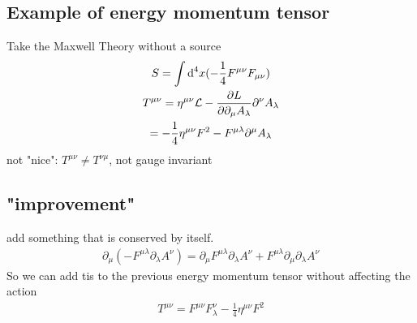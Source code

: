 \subsection{Example of energy momentum tensor}
Take the Maxwell Theory without a source
\begin{gather}
	S = \int \text d^4x (-\frac{1}{4}F^{\mu\nu}F_{\mu\nu})\\
	T^{\mu\nu} = \eta^{\mu\nu}\mathcal L - \frac{\partial L}{\partial\partial_\mu A_\lambda}\partial^\nu A_\lambda\\
	= -\frac{1}{4}\eta^{\mu\nu}F^2 - F^{\mu\lambda}\partial^\mu A_\lambda
\end{gather}
not "nice": $T^{\mu\nu} \neq T^{\nu\mu}$, not gauge invariant\\
\subsection{"improvement"}
add something that is conserved by itself.
\begin{gather}
	\partial_\mu\left(-F^{\mu\lambda}\partial_\lambda A^\nu\right) = \partial_\mu F^{\mu\lambda}\partial_\lambda A^\nu + F^{\mu\lambda}\partial_\mu\partial_\lambda A^\nu
\end{gather}
So we can add tis to the previous energy momentum tensor without affecting the action
\begin{gather}
	T^{\mu\nu} = F^{\mu\nu}F^\nu_\lambda - \frac{1}{4}\eta^{\mu\nu}F^2
\end{gather}













